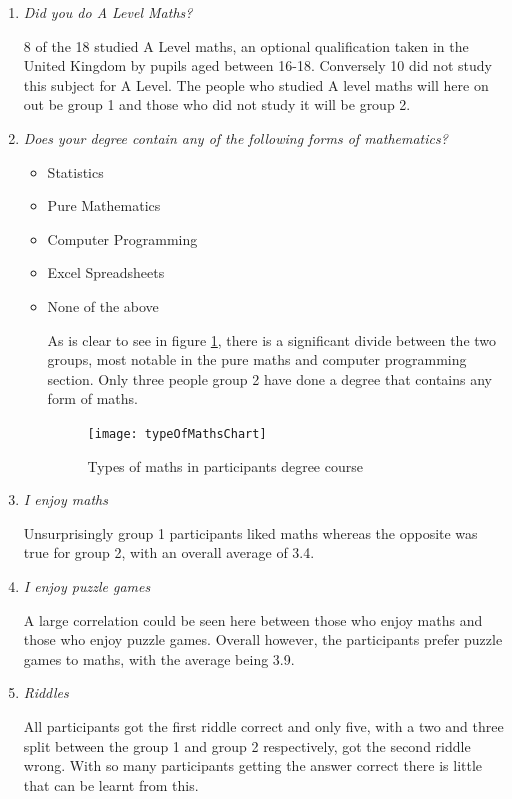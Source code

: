 \documentclass[12pt,a4paper]{report}
\begin{document}
\begin{enumerate}
	\item  \textit {Did you do A Level Maths?}
	
	8 of the 18 studied A Level maths, an optional qualification taken in the United Kingdom by pupils aged between 16-18. Conversely 10 did not study this subject for A Level. The people who studied A level maths will here on out be group 1 and those who did not study it will be group 2. 
	
	\item  \textit {Does your degree contain any of the following forms of mathematics?}
	\begin{itemize}
	\item Statistics
	\item Pure Mathematics
	\item Computer Programming
	\item Excel Spreadsheets
	\item None of the above
	
As is clear to see in figure \ref{fig:typeOfMathsChart}, there is a significant divide between the two groups, most notable in the pure maths and computer programming section. Only three people group 2 have done a degree that contains any form of maths.
	
\begin{figure}[h]
\centering
    \texttt{[image: typeOfMathsChart]}
    \caption{Types of maths in participants degree course}
        \label{fig:typeOfMathsChart}
\end{figure}
\FloatBarrier

\end{itemize}
	
	
	\item  \textit {I enjoy maths}
	
	Unsurprisingly group 1 participants liked maths whereas the opposite was true for group 2, with an overall average of 3.4.
	
	\item  \textit {I enjoy puzzle games}
	
	A large correlation could be seen here between those who enjoy maths and those who enjoy puzzle games. Overall however, the participants prefer puzzle games to maths, with the average being 3.9.
	
	\item  \textit {Riddles}
	
	 All participants got the first riddle correct and only five, with a two and three split between the group 1 and group 2 respectively, got the second riddle wrong. With so many participants getting the answer correct there is little that can be learnt from this.
	
	
\end{enumerate}
\end{document}
